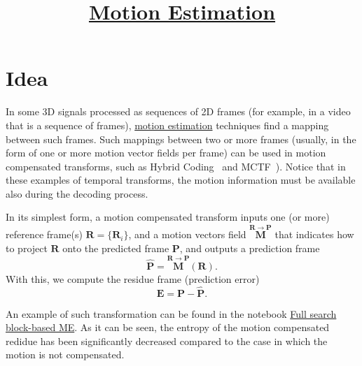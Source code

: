 
\title{\href{https://vicente-gonzalez-ruiz.github.io/motion_estimation}{Motion Estimation}}

\maketitle

\section{Idea}

In some 3D signals processed as sequences of 2D frames (for example,
in a video that is a sequence of frames),
\href{https://en.wikipedia.org/wiki/Motion_estimation}{motion
  estimation} techniques find a mapping between such frames. Such
mappings between two or more frames (usually, in the form of one or
more motion vector fields per frame) can be used in motion compensated
transforms, such as Hybrid Coding~\cite{vruiz__hybrid_coding} and
MCTF~\cite{vruiz__MCTF}). Notice that in these examples of temporal
transforms, the motion information must be available also during the
decoding process.

In its simplest form, a motion compensated transform inputs one (or
more) reference frame(s) ${\mathbf R}=\{{\mathbf R}_i\}$, and a motion
vectors field $\overset{{\mathbf R}\rightarrow{\mathbf P}}{\mathbf M}$
that indicates how to project ${\mathbf R}$ onto the predicted frame
${\mathbf P}$, and outputs a prediction frame
\begin{equation}
  \hat{{\mathbf P}} =  \overset{{\mathbf R}\rightarrow {\mathbf P}}{\mathbf M}({\mathbf R}).
  \label{eq:MCP1}
\end{equation}
With this, we compute the residue frame (prediction error)
\begin{equation}
  {\mathbf E} = {\mathbf P} - \hat{\mathbf P}.
\end{equation}

An example of such transformation can be found in the notebook
\href{https://github.com/vicente-gonzalez-ruiz/motion_estimation/blob/main/src/motion_estimation/full_search_block_ME.ipynb}{Full
  search block-based ME}. As it can be seen, the entropy of the motion
compensated redidue has been significantly decreased compared to the
case in which the motion is not compensated.

